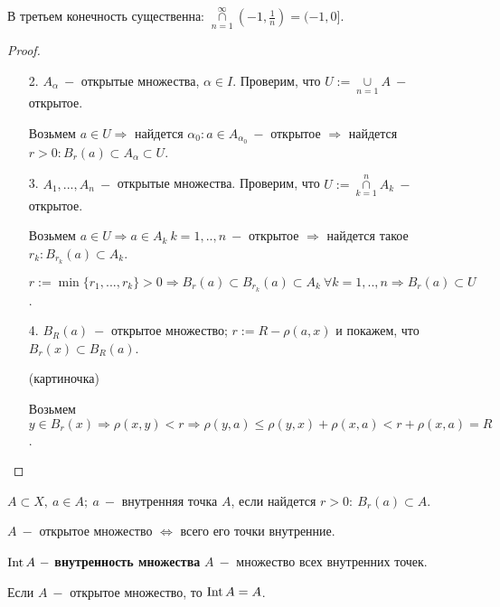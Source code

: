 \begin{remark}
    В третьем конечность существенна: $\cap\limits_{n=1}^\infty (-1,\frac{1}{n})=(-1,0]$.
\end{remark}

\begin{proof}
    \begin{enumerate}
        \item[]
        \item[2.] $A_\alpha\ -$ открытые множества, $\alpha\in I$. Проверим, что $U:=\cup\limits_{n=1}A\ -$ открытое.

        Возьмем $a\in U\Rightarrow$ найдется $\alpha_0:a\in A_{\alpha_0}\ -$ открытое $\Rightarrow $ найдется $r>0:B_r(a)\subset A_\alpha \subset U$.

        \item[3.] $A_1,...,A_n\ -$ открытые множества. Проверим, что $U:=\cap\limits_{k=1}^n A_k\ -$ открытое.

        Возьмем $a\in U\Rightarrow a\in A_k\ k=1,..,n\ -$ открытое $\Rightarrow $ найдется такое $r_k:B_{r_k}(a)\subset A_k$.

        $r:=\min\{r_1,...,r_k\}>0\Rightarrow B_r(a)\subset B_{r_k}(a)\subset A_k\ \forall k =1,..,n\Rightarrow B_r(a)\subset U$.

        \item[4.] $B_R(a)\ -$ открытое множество; $r:=R-\rho(a,x)$ и покажем, что $B_r(x)\subset B_R(a)$.

        (картиночка)

        Возьмем $y\in B_r(x)\Rightarrow \rho(x,y)<r\Rightarrow \rho(y,a)\leq \rho(y,x)+\rho(x,a)<r+\rho(x,a)=R$.
    \end{enumerate}
\end{proof}

\begin{definition}
    $A\subset X,\ a\in A;\ a\ -$ внутренняя точка $A$, если найдется $r>0:\ B_r(a)\subset A$.
\end{definition}

\begin{remark}
    $A\ -$ открытое множество $\Leftrightarrow$ всего его точки внутренние.
\end{remark}

\begin{definition}
    $\operatorname{Int} A\ -$ \textbf{внутренность множества} $A\ -$ множество всех внутренних точек.
\end{definition}

\begin{remark}
    Если $A\ -$ открытое множество, то $\operatorname{Int} A=A$.
\end{remark}


